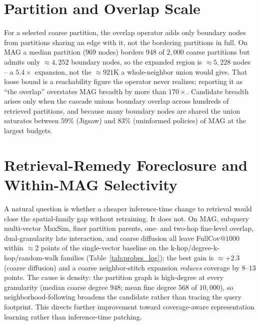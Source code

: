 \documentclass[sigconf, nonacm]{acmart}
\begin{document}
\section{Partition and Overlap Scale}
\label{app:partitions}

For a selected coarse partition, the overlap operator adds only boundary nodes from partitions sharing an edge with it, not the bordering partitions in full. On MAG a median partition ($969$ nodes) borders $948$ of $2{,}000$ coarse partitions but admits only ${\approx}4{,}252$ boundary nodes, so the expanded region is ${\approx}5{,}228$ nodes -- a $5.4\times$ expansion, not the ${\approx}921$K a whole-neighbor union would give. That loose bound is a reachability figure the operator never realizes; reporting it as ``the overlap'' overstates MAG breadth by more than $170\times$. Candidate breadth arises only when the cascade unions boundary overlap across hundreds of retrieved partitions, and because many boundary nodes are shared the union saturates between $59\%$ (Jigsaw) and $83\%$ (uninformed policies) of MAG at the largest budgets.

\section{Retrieval-Remedy Foreclosure and Within-MAG Selectivity}
\label{app:probes}

A natural question is whether a cheaper inference-time change to retrieval would close the spatial-family gap without retraining. It does not. On MAG, subquery multi-vector MaxSim, finer partition parents, one- and two-hop fine-level overlap, dual-granularity late interaction, and coarse diffusion all leave FullCov@$1000$ within ${\approx}2$ points of the single-vector baseline on the k-hop/degree-k-hop/random-walk families (Table~\ref{tab:probes_log}); the best gain is ${\approx}{+}2.3$ (coarse diffusion) and a coarse neighbor-stitch expansion \emph{reduces} coverage by $8$--$13$ points. The cause is density: the partition graph is high-degree at every granularity (median coarse degree $948$; mean fine degree $568$ of $10{,}000$), so neighborhood-following broadens the candidate rather than tracing the query footprint. This directs further improvement toward coverage-aware representation learning rather than inference-time patching.
\end{document}
